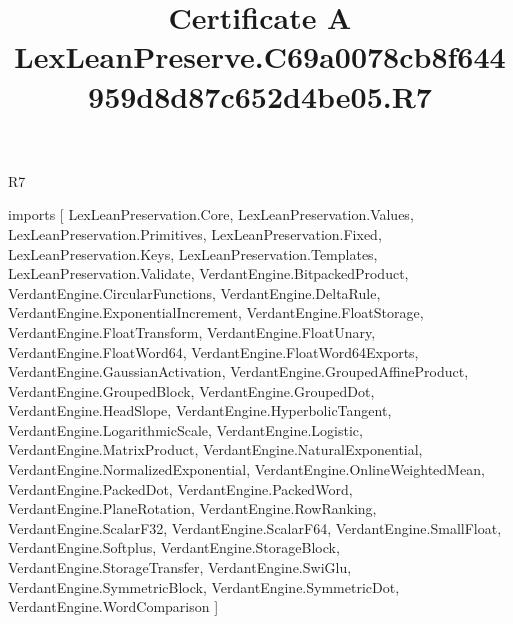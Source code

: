 \begin{lexlean}{R7}
\title{Certificate A LexLeanPreserve.C69a0078cb8f644959d8d87c652d4be05.R7}
\begin{coremodule}
imports [
  LexLeanPreservation.Core,
  LexLeanPreservation.Values,
  LexLeanPreservation.Primitives,
  LexLeanPreservation.Fixed,
  LexLeanPreservation.Keys,
  LexLeanPreservation.Templates,
  LexLeanPreservation.Validate,
  VerdantEngine.BitpackedProduct,
  VerdantEngine.CircularFunctions,
  VerdantEngine.DeltaRule,
  VerdantEngine.ExponentialIncrement,
  VerdantEngine.FloatStorage,
  VerdantEngine.FloatTransform,
  VerdantEngine.FloatUnary,
  VerdantEngine.FloatWord64,
  VerdantEngine.FloatWord64Exports,
  VerdantEngine.GaussianActivation,
  VerdantEngine.GroupedAffineProduct,
  VerdantEngine.GroupedBlock,
  VerdantEngine.GroupedDot,
  VerdantEngine.HeadSlope,
  VerdantEngine.HyperbolicTangent,
  VerdantEngine.LogarithmicScale,
  VerdantEngine.Logistic,
  VerdantEngine.MatrixProduct,
  VerdantEngine.NaturalExponential,
  VerdantEngine.NormalizedExponential,
  VerdantEngine.OnlineWeightedMean,
  VerdantEngine.PackedDot,
  VerdantEngine.PackedWord,
  VerdantEngine.PlaneRotation,
  VerdantEngine.RowRanking,
  VerdantEngine.ScalarF32,
  VerdantEngine.ScalarF64,
  VerdantEngine.SmallFloat,
  VerdantEngine.Softplus,
  VerdantEngine.StorageBlock,
  VerdantEngine.StorageTransfer,
  VerdantEngine.SwiGlu,
  VerdantEngine.SymmetricBlock,
  VerdantEngine.SymmetricDot,
  VerdantEngine.WordComparison
]


\end{coremodule}
\end{lexlean}
